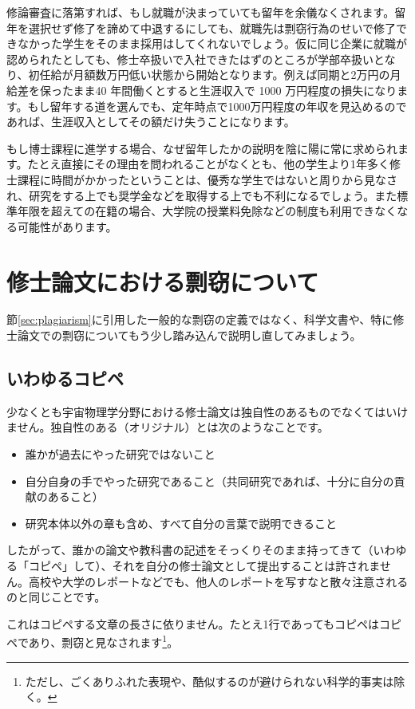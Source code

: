 修論審査に落第すれば、もし就職が決まっていても留年を余儀なくされます。留年を選択せず修了を諦めて中退するにしても、就職先は剽窃行為のせいで修了できなかった学生をそのまま採用はしてくれないでしょう。仮に同じ企業に就職が認められたとしても、修士卒扱いで入社できたはずのところが学部卒扱いとなり、初任給が月額数万円低い状態から開始となります。例えば同期と2万円の月給差を保ったまま40 年間働くとすると生涯収入で 1000 万円程度の損失になります。もし留年する道を選んでも、定年時点で1000万円程度の年収を見込めるのであれば、生涯収入としてその額だけ失うことになります。

もし博士課程に進学する場合、なぜ留年したかの説明を陰に陽に常に求められます。たとえ直接にその理由を問われることがなくとも、他の学生より1年多く修士課程に時間がかかったということは、優秀な学生ではないと周りから見なされ、研究をする上でも奨学金などを取得する上でも不利になるでしょう。また標準年限を超えての在籍の場合、大学院の授業料免除などの制度も利用できなくなる可能性があります。

\section{修士論文における剽窃について}
節\ref{sec:plagiarism}に引用した一般的な剽窃の定義ではなく、科学文書や、特に修士論文での剽窃についてもう少し踏み込んで説明し直してみましょう。

\subsection{いわゆるコピペ}
\label{subsec:plagiarism1}
少なくとも宇宙物理学分野における修士論文は独自性のあるものでなくてはいけません。独自性のある（オリジナル）とは次のようなことです。
\begin{itemize}
\item 誰かが過去にやった研究ではないこと
\item 自分自身の手でやった研究であること（共同研究であれば、十分に自分の貢献のあること）
\item 研究本体以外の章も含め、すべて自分の言葉で説明できること
\end{itemize}

したがって、誰かの論文や教科書の記述をそっくりそのまま持ってきて（いわゆる「コピペ」して）、それを自分の修士論文として提出することは許されません。高校や大学のレポートなどでも、他人のレポートを写すなと散々注意されるのと同じことです。

これはコピペする文章の長さに依りません。たとえ1行であってもコピペはコピペであり、剽窃と見なされます\footnote{ただし、ごくありふれた表現や、酷似するのが避けられない科学的事実は除く。}。

